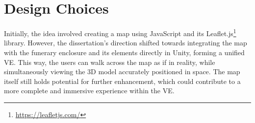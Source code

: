 \section{Design Choices}
\label{sec:design}
Initially, the idea involved creating a map using JavaScript and its Leaflet.js\footnote{\url{https://leafletjs.com/}} library. 
However, the dissertation's direction shifted towards integrating the map with the funerary enclosure and its elements directly in Unity, forming a unified \gls{VE}. This way, the users can walk across the map as if in reality, while simultaneously viewing the \gls{3D} model accurately positioned in space. 
The map itself still holds potential for further enhancement, which could contribute to a more complete and immersive experience within the \gls{VE}.








